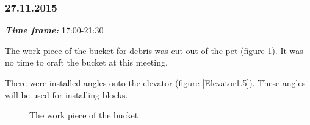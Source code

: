 \subsubsection{27.11.2015}
\textit{\textbf{Time frame:}} 17:00-21:30

The work piece of the bucket for debris was cut out of the pet (figure \ref{Bucket0.1}). It was no time to craft the bucket at this meeting.

There were installed angles onto the elevator (figure \ref{Elevator1.5}). These angles will be used for installing blocks.

  	\begin{figure}[H]
  		\begin{minipage}[h]{0.47\linewidth}
  			\caption{The work piece of the bucket}
  			\label{Bucket0.1}
  		\end{minipage}
  		\hfill
  		\begin{minipage}[h]{0.47\linewidth}

\end{minipage}
\end{figure}
